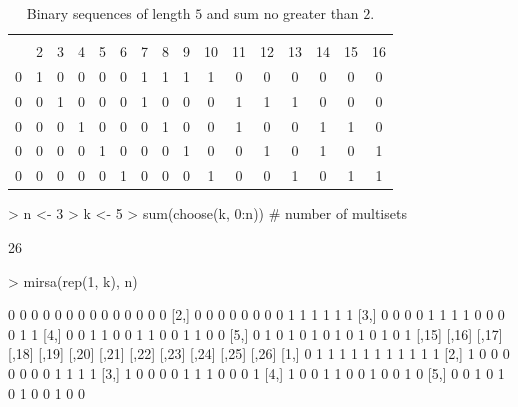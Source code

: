 \documentclass[12pt]{article}
\begin{document}
\begin{table}
  \centering
  \begin{tabular}{|c|c|c|c|c|c|c|c|c|c|c|c|c|c|c|c|}
    \hline
    \rowcolor{bg}
      \multicolumn{16}{|c|}{sequence} \\
    \rowcolor{bg}
      \multicolumn{1}{|c}{1} & \multicolumn{1}{c}{2}  & \multicolumn{1}{c}{3} &
      \multicolumn{1}{c}{4}  & \multicolumn{1}{c}{5}  & \multicolumn{1}{c}{6} &
      \multicolumn{1}{c}{7}  & \multicolumn{1}{c}{8}  & \multicolumn{1}{c}{9} &
      \multicolumn{1}{c}{10} & \multicolumn{1}{c}{11} & \multicolumn{1}{c}{12} &
      \multicolumn{1}{c}{13} & \multicolumn{1}{c}{14} & \multicolumn{1}{c}{15} &
      16 \\
     \hline  
    0 & 1 & 0 & 0 & 0 & 0 & 1 & 1 & 1 & 1 & 0 & 0 & 0 & 0 & 0 & 0 \\
    0 & 0 & 1 & 0 & 0 & 0 & 1 & 0 & 0 & 0 & 1 & 1 & 1 & 0 & 0 & 0 \\
    0 & 0 & 0 & 1 & 0 & 0 & 0 & 1 & 0 & 0 & 1 & 0 & 0 & 1 & 1 & 0 \\
    0 & 0 & 0 & 0 & 1 & 0 & 0 & 0 & 1 & 0 & 0 & 1 & 0 & 1 & 0 & 1 \\
    0 & 0 & 0 & 0 & 0 & 1 & 0 & 0 & 0 & 1 & 0 & 0 & 1 & 0 & 1 & 1 \\
    \hline
  \end{tabular}
  \caption{Binary sequences of length $5$ and sum no greater than $2$.}
  \label{tab:ex3}
\end{table}  
  
\begin{Schunk}
\begin{Sinput}
> n <- 3
> k <- 5
> sum(choose(k, 0:n))  # number of multisets
\end{Sinput}
\begin{Soutput}
[1] 26
\end{Soutput}
\begin{Sinput}
> mirsa(rep(1, k), n)
\end{Sinput}
\begin{Soutput}
     [,1] [,2] [,3] [,4] [,5] [,6] [,7] [,8] [,9] [,10] [,11] [,12] [,13] [,14]
[1,]    0    0    0    0    0    0    0    0    0     0     0     0     0     0
[2,]    0    0    0    0    0    0    0    0    1     1     1     1     1     1
[3,]    0    0    0    0    1    1    1    1    0     0     0     0     1     1
[4,]    0    0    1    1    0    0    1    1    0     0     1     1     0     0
[5,]    0    1    0    1    0    1    0    1    0     1     0     1     0     1
     [,15] [,16] [,17] [,18] [,19] [,20] [,21] [,22] [,23] [,24] [,25] [,26]
[1,]     0     1     1     1     1     1     1     1     1     1     1     1
[2,]     1     0     0     0     0     0     0     0     1     1     1     1
[3,]     1     0     0     0     0     1     1     1     0     0     0     1
[4,]     1     0     0     1     1     0     0     1     0     0     1     0
[5,]     0     0     1     0     1     0     1     0     0     1     0     0
\end{Soutput}
\end{Schunk}
\end{document}
